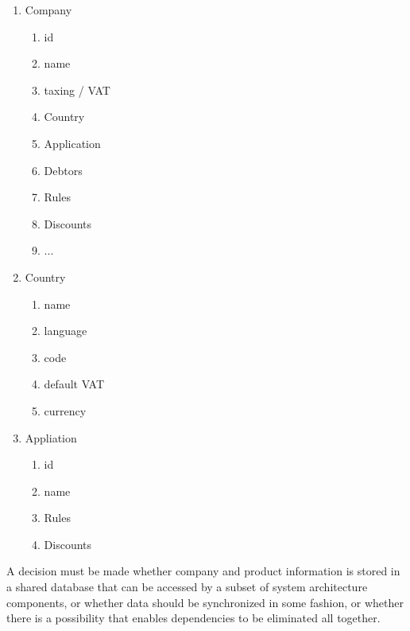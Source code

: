 \begin{multicols}{2}
	\begin{enumerate}
		\item Company
		      \begin{enumerate}
			      \item id
			      \item name
			      \item taxing / VAT
			      \item Country
			      \item Application
			      \item Debtors
			      \item Rules
			      \item Discounts
			      \item ...
		      \end{enumerate}
		\item Country
		      \begin{enumerate}
			      \item name
			      \item language
			      \item code
			      \item default VAT
			      \item currency
		      \end{enumerate}
		\item Appliation
		      \begin{enumerate}
			      \item id
			      \item name
			      \item Rules
			      \item Discounts
		      \end{enumerate}
	\end{enumerate}
\end{multicols}

A decision must be made whether company and product information is stored in a shared database that can be accessed by a subset of system architecture components, or whether data should be synchronized in some fashion, or whether there is a possibility that enables dependencies to be eliminated all together.

%
